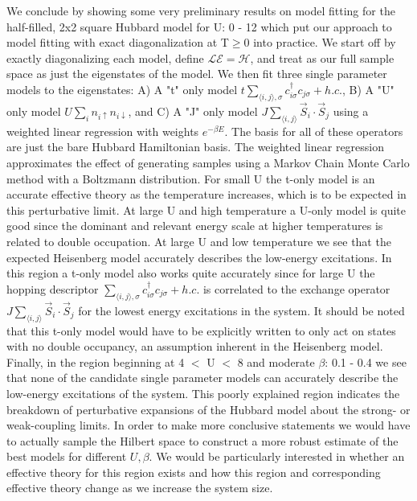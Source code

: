 \documentclass[12pt]{article}
\begin{document}
We conclude by showing some very preliminary results on model fitting for the half-filled, 2x2 square Hubbard model for U: 0 - 12 which put our approach to model fitting with exact diagonalization at T$\geq 0$ into practice.
We start off by exactly diagonalizing each model, define $\mathcal{LE} = \mathcal{H}$, and treat as our full sample space as just the eigenstates of the model.
We then fit three single parameter models to the eigenstates: A) 
A "t" only model $t \sum_{\langle i, j \rangle, \sigma} c_{i\sigma}^\dagger c_{j\sigma} + h.c.$, B) A "U" only model $U \sum_{i} n_{i\uparrow} n_{i\downarrow}$, and C) A "J" only model $J \sum_{\langle i,j \rangle} \vec{S}_i \cdot \vec{S}_j$ using a weighted linear regression with weights $e^{-\beta E}$.
The basis for all of these operators are just the bare Hubbard Hamiltonian basis.
The weighted linear regression approximates the effect of generating samples using a Markov Chain Monte Carlo method with a Boltzmann distribution.
For small U the t-only model is an accurate effective theory as the temperature increases, which is to be expected in this perturbative limit.
At large U and high temperature a U-only model is quite good since the dominant and relevant energy scale at higher temperatures is related to double occupation.
At large U and low temperature we see that the expected Heisenberg model accurately describes the low-energy excitations. 
In this region a t-only model also works quite accurately since for large U the hopping descriptor $\sum_{\langle i, j \rangle, \sigma} c_{i\sigma}^\dagger c_{j\sigma} + h.c.$ is correlated to the exchange operator $J \sum_{\langle i,j \rangle} \vec{S}_i \cdot \vec{S}_j$ for the lowest energy excitations in the system.
It should be noted that this t-only model would have to be explicitly written to only act on states with no double occupancy, an assumption inherent in the Heisenberg model. 
Finally, in the region beginning at 4 $<$ U $<$ 8 and moderate $\beta$: 0.1 - 0.4 we see that none of the candidate single parameter models can accurately describe the low-energy excitations of the system.
This poorly explained region indicates the breakdown of perturbative expansions of the Hubbard model about the strong- or weak-coupling limits.
In order to make more conclusive statements we would have to actually sample the Hilbert space to construct a more robust estimate of the best models for different $U, \beta$.
We would be particularly interested in whether an effective theory for this region exists and how this region and corresponding effective theory change as we increase the system size.
\end{document}
